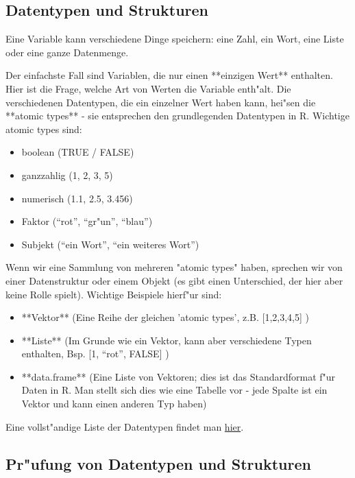 \documentclass[a4paper,twoside]{tufte-book}\usepackage[]{graphicx}\usepackage[]{color}
\begin{document}
\begin{appendices}
\section{Datentypen und Strukturen}

Eine Variable kann verschiedene Dinge speichern: eine Zahl, ein Wort, eine Liste oder eine ganze Datenmenge.

Der einfachste Fall sind Variablen, die nur einen **einzigen Wert** enthalten. Hier ist die Frage, welche Art von Werten die Variable enth"alt. Die verschiedenen Datentypen, die ein einzelner Wert haben kann, hei"sen die **atomic types** - sie entsprechen den grundlegenden Datentypen in R. Wichtige atomic types sind:

  \begin{itemize}
		\item boolean (TRUE / FALSE)
		\item ganzzahlig (1, 2, 3, 5)
		\item numerisch (1.1, 2.5, 3.456)
		\item Faktor ("`rot"', "`gr"un"', "`blau"')
		\item Subjekt ("`ein Wort"', "`ein weiteres Wort"')
	\end{itemize}

Wenn wir eine Sammlung von mehreren "atomic types" haben, sprechen wir von einer Datenstruktur oder einem Objekt (es gibt einen Unterschied, der hier aber keine Rolle spielt). Wichtige Beispiele hierf"ur sind:

  \begin{itemize}
		\item **Vektor** (Eine Reihe der gleichen 'atomic types', z.B. [1,2,3,4,5] )
		\item **Liste** (Im Grunde wie ein Vektor, kann aber verschiedene Typen enthalten, Bsp. [1, "`rot"', FALSE] )
		\item **data.frame** (Eine Liste von Vektoren; dies ist das Standardformat f"ur Daten in R. Man stellt sich dies wie eine Tabelle vor - jede Spalte ist ein Vektor und kann einen anderen Typ haben)
	\end{itemize}

Eine vollst"andige Liste der Datentypen findet man \href{http://www.statmethods.net/input/datatypes.html}{hier}. 
 
\subsection{Pr"ufung von Datentypen und Strukturen}


\end{appendices}
\end{document}
